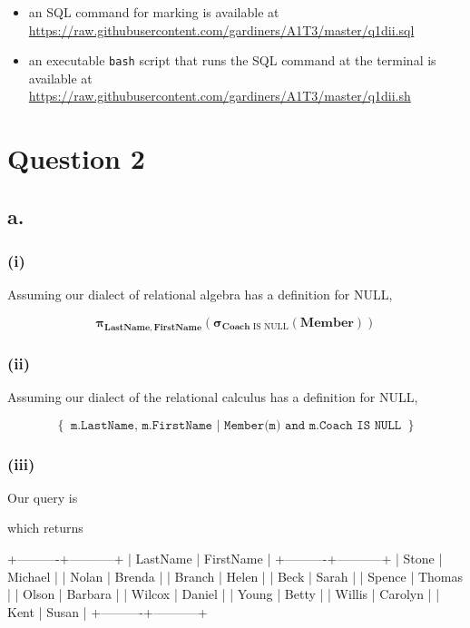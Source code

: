 \documentclass{article}
\newcommand{\select}[1]{
\boldsymbol{\sigma}_{#1}
}
\newcommand{\project}[1]{
\boldsymbol{\pi}_{#1}
}
\begin{document}
\begin{itemize}
    \item an SQL command for marking is available at \url{https://raw.githubusercontent.com/gardiners/A1T3/master/q1dii.sql}
    \item an executable \texttt{bash} script that runs the SQL command at the terminal is available at \url{https://raw.githubusercontent.com/gardiners/A1T3/master/q1dii.sh}
\end{itemize}

\section{Question 2}

\subsection{a.}

\subsubsection{(i)}

Assuming our dialect of relational algebra has a definition for NULL,

$$
\project{\mathbf{LastName, FirstName}}
\left(
\select{\mathbf{Coach} \text{ IS NULL}}\left(\mathbf{Member}\right)
\right)
$$

\subsubsection{(ii)}

Assuming our dialect of the relational calculus has a definition for NULL,

$$
\left\{
\texttt{ m.LastName, m.FirstName | Member(m) and m.Coach IS NULL }
\right\}
$$

\subsubsection{(iii)}

Our query is


which returns

\begin{bashinline}
+----------+-----------+
| LastName | FirstName |
+----------+-----------+
| Stone    | Michael   |
| Nolan    | Brenda    |
| Branch   | Helen     |
| Beck     | Sarah     |
| Spence   | Thomas    |
| Olson    | Barbara   |
| Wilcox   | Daniel    |
| Young    | Betty     |
| Willis   | Carolyn   |
| Kent     | Susan     |
+----------+-----------+
\end{bashinline}
\end{document}
